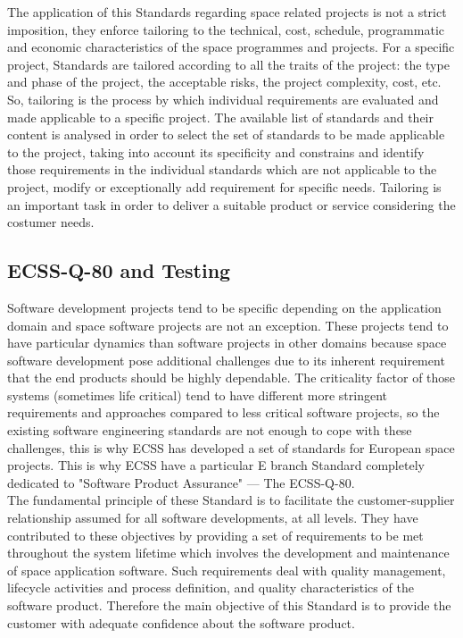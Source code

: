 The application of this Standards regarding space related projects is not a strict imposition, they enforce
tailoring to the technical, cost, schedule, programmatic and economic characteristics of the space programmes and projects.
For a specific project, Standards are tailored according to all the traits of the project: the type and 
phase of the project, the acceptable risks, the project complexity, cost, etc.
So, tailoring is the process by which individual requirements are evaluated and made applicable to a specific project.
The available list of standards and their content is analysed in order to select the set of standards to be made applicable to the project, taking 
into account its specificity and constrains and identify those requirements in the individual standards which are not 
applicable to the project, modify or exceptionally add requirement for specific needs\cite{ecss-s-st-00c}.
Tailoring is an important task in order to deliver a suitable product or service considering the costumer needs.

\subsection{ECSS-Q-80 and Testing}\label{sec:stand}
Software development projects tend to be specific depending on the application domain and 
space software projects are not an exception. These projects tend to have particular dynamics than software projects
in other domains because space software development pose additional challenges due to its inherent
requirement that the end products should be highly dependable.
The criticality factor of those systems (sometimes life critical) tend to have different more stringent requirements and approaches 
compared to less critical software projects, so
the existing software engineering standards are not enough to cope with these challenges, this is why \ac{ECSS} has developed a set of standards for European
space projects\cite{Ahmad2010AgileECSS,10.1109/SESS.1997.595952}.
This is why \ac{ECSS} have a particular E branch Standard completely dedicated to "Software Product Assurance" --- The ECSS-Q-80\cite{ecss-q-st-80c}.\\

The fundamental principle of these Standard is to facilitate the
customer-supplier relationship assumed for all software developments, at all levels.
They have contributed to these objectives by providing a set of requirements to be
met throughout the system lifetime which involves the development and
maintenance of space application software. Such requirements deal with quality
management, lifecycle activities and process definition, and quality
characteristics of the software product\cite{Mattiello-FranciscoSanAmbJogCos:2007:BrSoIn}.
Therefore the main objective of this Standard is to provide the customer with adequate confidence about the software product.\\

